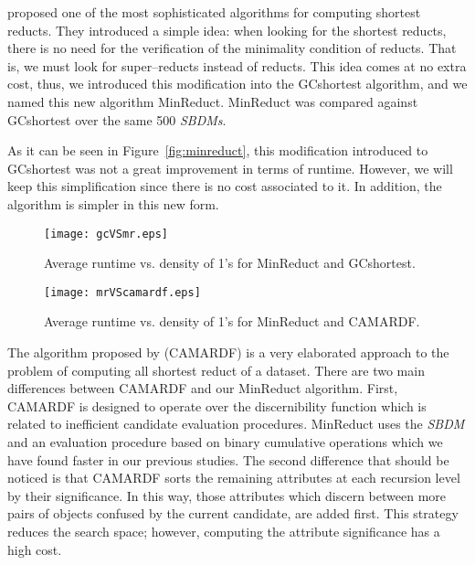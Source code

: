 \documentclass[authoryear,11pt]{elsarticle}
\begin{document}
 \cite{Zhou2009} proposed one of the most sophisticated algorithms for computing shortest reducts. They introduced a simple idea: when looking for the shortest reducts, there is no need for the verification of the minimality condition of reducts. That is, we must look for super--reducts instead of reducts. This idea comes at no extra cost, thus, we introduced this modification into the GCshortest algorithm, and we named this new algorithm MinReduct. MinReduct was compared against GCshortest over the same 500 \textit{SBDMs}.
 
 As it can be seen in Figure~\ref{fig:minreduct}, this modification introduced to GCshortest was not a great improvement in terms of runtime. However, we will keep this simplification since there is no cost associated to it. In addition, the algorithm is simpler in this new form. 
 
   \begin{figure}[htb]
   	\begin{minipage}{.48\linewidth}  	
   		\begin{center}
   			\texttt{[image: gcVSmr.eps]}
   		\end{center}
   		\caption{Average runtime vs. density of 1's for MinReduct and GCshortest.}
   		\label{fig:minreduct}
   	\end{minipage}
   	\begin{minipage}{.48\linewidth}  
   		\begin{center}
   			\texttt{[image: mrVScamardf.eps]}
   		\end{center}
   		\caption{Average runtime vs. density of 1's for MinReduct and CAMARDF.}
   		\label{fig:camardf}
   	\end{minipage}
   \end{figure}
   
   The algorithm proposed by \cite{Zhou2009} (CAMARDF) is a very elaborated approach to the problem of computing all shortest reduct of a dataset. There are two main differences between CAMARDF  and our MinReduct algorithm. First, CAMARDF is designed to operate over the discernibility function which is related to inefficient candidate evaluation procedures. MinReduct uses the \textit{SBDM} and an evaluation procedure based on binary cumulative operations which we have found faster in our previous studies. The second difference that should be noticed is that CAMARDF sorts the remaining attributes at each recursion level by their significance. In this way, those attributes which discern between more pairs of objects confused by the current candidate, are added first. This strategy reduces the search space; however, computing the attribute significance has a high cost.
   
\end{document}
